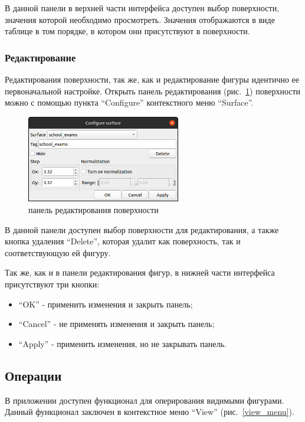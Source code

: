 \documentclass[12pt, a4paper, hidelinks]{article}
\begin{document}
В данной панели в верхней части интерфейса доступен выбор поверхности, значения которой необходимо просмотреть. Значения отображаются в виде таблице в том порядке, в котором они присутствуют в поверхности.

\subsubsection{Редактирование}
Редактирования поверхности, так же, как и редактирование фигуры идентично ее первоначальной настройке. Открыть панель редактирования (рис.~\ref{surface_cfg}) поверхности можно с помощью пункта \enquote{Configure} контекстного меню \enquote{Surface}.

\begin{figure}[htbp!]
	\centering
	\includegraphics[width=0.6\textwidth]{images/surfacecfg.png}
	\caption{панель редактирования поверхности}
	\label{surface_cfg}
\end{figure}

В данной панели доступен выбор поверхности для редактирования, а также кнопка удаления \enquote{Delete}, которая удалит как поверхность, так и соответствующую ей фигуру.

Так же, как и в панели редактирования фигур, в нижней части интерфейса присутствуют три кнопки:
\begin{itemize}
    \item \enquote{OK} - применить изменения и закрыть панель;
    \item \enquote{Cancel} - не применять изменения и закрыть панель;
    \item \enquote{Apply} - применить изменения, но не закрывать панель.
\end{itemize}

\subsection{Операции}
В приложении доступен функционал для оперирования видимыми фигурами. Данный функционал заключен в контекстное меню \enquote{View} (рис.~\ref{view_menu}).
\end{document}

